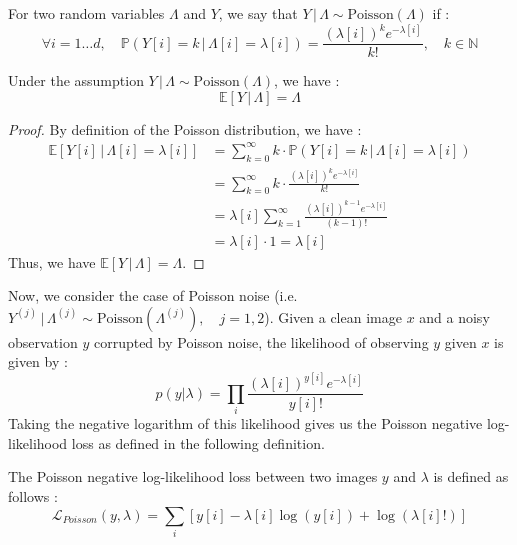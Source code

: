 \begin{definition}
    For two random variables $\Lambda$ and $Y$, we say that $Y \,|\, \Lambda \sim \text{Poisson}(\Lambda)$ if :
    \begin{equation*}
        \forall i = 1 \dots d, \quad \mathbb{P}(Y[i] = k \,|\, \Lambda[i] = \lambda[i]) = \frac{(\lambda[i])^k e^{-\lambda[i]}}{k!}, \quad k \in \mathbb{N}
    \end{equation*}
\end{definition}

\begin{proposition}
    Under the assumption $Y \,|\, \Lambda \sim \text{Poisson}(\Lambda)$, we have :
    \begin{equation*}
        \mathbb{E}[Y \,|\, \Lambda] = \Lambda
    \end{equation*}
\end{proposition}

\begin{proof}
    By definition of the Poisson distribution, we have :
    \begin{align*}
        \mathbb{E}[Y[i] \,|\, \Lambda[i] = \lambda[i]] &= \sum_{k=0}^{\infty} k \cdot \mathbb{P}(Y[i] = k \,|\, \Lambda[i] = \lambda[i]) \\
        &= \sum_{k=0}^{\infty} k \cdot \frac{(\lambda[i])^k e^{-\lambda[i]}}{k!} \\
        &= \lambda[i] \sum_{k=1}^{\infty} \frac{(\lambda[i])^{k-1} e^{-\lambda[i]}}{(k-1)!} \\
        &= \lambda[i] \cdot 1 = \lambda[i]
    \end{align*}
    Thus, we have $\mathbb{E}[Y \,|\, \Lambda] = \Lambda$.
\end{proof}

Now, we consider the case of Poisson noise (i.e. $Y^{(j)} \,|\, \Lambda^{(j)} \sim \text{Poisson}(\Lambda^{(j)}), \quad j = 1, 2$).
Given a clean image $x$ and a noisy observation $y$ corrupted by Poisson noise, the likelihood of observing $y$ given $x$ is given by :
\begin{equation*}
    p(y|\lambda) = \prod_{i} \frac{(\lambda[i])^{y[i]} e^{-\lambda[i]}}{y[i]!}
\end{equation*}
Taking the negative logarithm of this likelihood gives us the Poisson negative log-likelihood loss as defined in the following definition.

\begin{definition}
    The Poisson negative log-likelihood loss between two images $y$ and $\lambda$ is defined as follows :
    \begin{equation*}
        \mathcal{L}_{Poisson}(y, \lambda) = \sum_{i} \left[ y[i] - \lambda[i] \log(y[i]) + \log(\lambda[i]!) \right]
    \end{equation*}
\end{definition}

